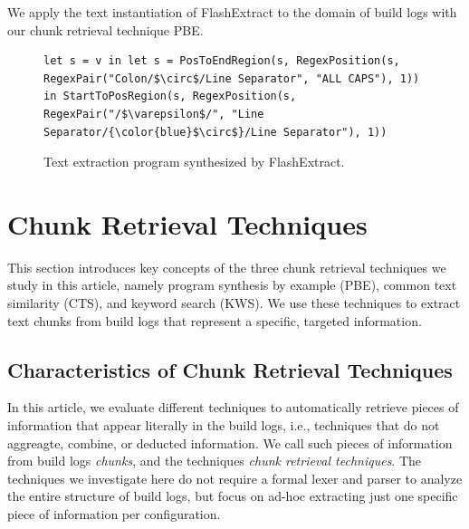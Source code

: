 We apply the text instantiation of FlashExtract to the domain of build logs with our chunk retrieval technique PBE\@.

\begin{figure}[!t]
  \centering
  \begin{lstlisting}[breaklines=true]
let s = v in let s = PosToEndRegion(s, RegexPosition(s, RegexPair("Colon/$\circ$/Line Separator", "ALL CAPS"), 1)) in StartToPosRegion(s, RegexPosition(s, RegexPair("/$\varepsilon$/", "Line Separator/{\color{blue}$\circ$}/Line Separator"), 1))
  \end{lstlisting}  
  \caption{Text extraction program synthesized by FlashExtract.}
  \label{lst:prose-program}
\end{figure}

\section{Chunk Retrieval Techniques}
\label{sec:techniques}
This section introduces key concepts of the three chunk retrieval techniques we study in this article, namely program synthesis by example (PBE), common text similarity (CTS), and keyword search (KWS).
We use these techniques to extract text chunks from build logs that represent a specific, targeted information.

\subsection{Characteristics of Chunk Retrieval Techniques}
\label{sec:blirt}
In this article, we evaluate different techniques to automatically retrieve pieces of information that appear literally in the build logs, i.e., techniques that do not aggreagte, combine, or deducted information. We call such pieces of information from build logs \emph{chunks}, and the techniques \emph{chunk retrieval techniques}.
The techniques we investigate here do not require a formal lexer and parser to analyze the entire structure of build logs, but focus on ad-hoc extracting just one specific piece of information per configuration.

